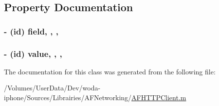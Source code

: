 \subsection{Property Documentation}
\hypertarget{interface_a_f_query_string_pair_a56a6a5052194b3fd862dc7eed618a646}{
\subsubsection[{field}]{\setlength{\rightskip}{0pt plus 5cm}-\/ (id) field\hspace{0.3cm}{\ttfamily [read]}, {\ttfamily [write]}, {\ttfamily [nonatomic]}, {\ttfamily [strong]}}}\label{interface_a_f_query_string_pair_a56a6a5052194b3fd862dc7eed618a646}
\hypertarget{interface_a_f_query_string_pair_a8aafaee91dab273d51a9448bfb4e7676}{
\subsubsection[{value}]{\setlength{\rightskip}{0pt plus 5cm}-\/ (id) value\hspace{0.3cm}{\ttfamily [read]}, {\ttfamily [write]}, {\ttfamily [nonatomic]}, {\ttfamily [strong]}}}\label{interface_a_f_query_string_pair_a8aafaee91dab273d51a9448bfb4e7676}


The documentation for this class was generated from the following file\-:\begin{DoxyCompactItemize}
\item 
/\-Volumes/\-User\-Data/\-Dev/woda-\/iphone/\-Sources/\-Librairies/\-A\-F\-Networking/\hyperlink{_a_f_h_t_t_p_client_8m}{A\-F\-H\-T\-T\-P\-Client.\-m}\end{DoxyCompactItemize}
